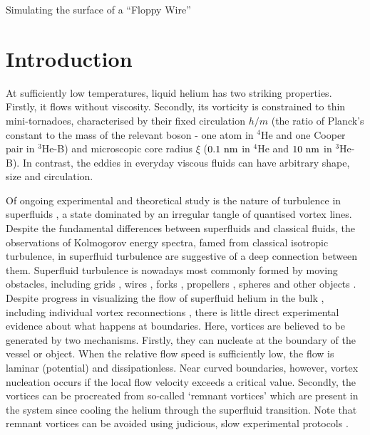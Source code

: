\begin{chapter}{\label{cha:afm}Simulating the surface of a ``Floppy Wire''}
\section{Introduction}
At sufficiently low temperatures, liquid helium has two striking
properties.  Firstly, it flows without viscosity.  Secondly,
its vorticity is constrained to
thin mini-tornadoes, characterised by their fixed circulation
$h/m$ (the ratio of Planck's constant to
the mass of the relevant boson - one atom in $^4$He and one Cooper pair 
in $^3$He-B) and microscopic core radius $\xi$ 
($0.1~\rm nm$ in $^4$He and $10~\rm nm$ in $^3$He-B).  
In contrast, the eddies in everyday viscous fluids can have arbitrary shape, 
size and circulation.  

Of ongoing experimental and theoretical study is the nature of 
turbulence in superfluids 
\cite{Barenghi2014,Bradley11,PhysRevLett.115.155303,PhysRevLett.110.014502}, a state 
dominated by an irregular tangle of quantised vortex lines.  Despite the fundamental differences between superfluids and classical fluids, the observations of Kolmogorov energy spectra, famed from classical isotropic turbulence, in superfluid turbulence \cite{Barenghi2014} are suggestive of a deep connection between them.  Superfluid turbulence is nowadays most commonly formed by moving obstacles, including grids \cite{Davis2000}, wires \cite{Guenault1986,Bradley2005,Bradley2011,Fisher2001}, forks \cite{Blaauwgeers2007,Bradley2012}, propellers \cite{Tabeling1998,Salort}, spheres \cite{Schoepe1995} and other objects \cite{VinenSkrbek2008}.
Despite progress in visualizing the flow of superfluid helium in the
bulk \cite{PhysRevLett.115.155303,PhysRevB.92.064519}, including individual vortex reconnections
\cite{Bewley09}, there is little direct experimental evidence
about what happens at boundaries.
Here, vortices are believed to be generated by two mechanisms.  Firstly, 
they can nucleate at the boundary of the vessel or object.  
When the relative flow speed is sufficiently low, the flow is laminar 
{(potential)} and dissipationless.  
{Near curved boundaries, however, vortex nucleation occurs if
the local flow velocity exceeds a critical value.} 
Secondly, the vortices can be procreated from so-called `remnant vortices' 
which are present in the system since cooling the helium through the superfluid transition.  Note that remnant vortices can be avoided using judicious, slow experimental protocols \cite{PhysRevB.76.020504}. 


\end{chapter}
